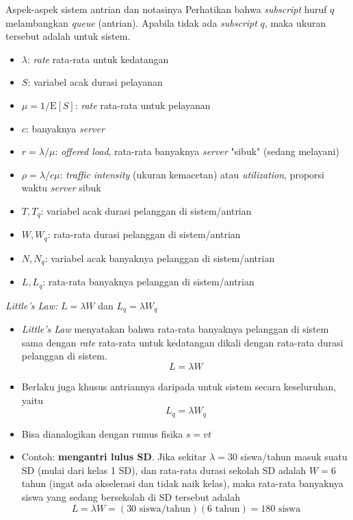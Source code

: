 \documentclass{beamer}
\newcommand{\pars}[1]{\left(#1\right)}
\newcommand{\brackets}[1]{\left[#1\right]}
\begin{document}
\begin{frame}{Aspek-aspek sistem antrian dan notasinya}
    Perhatikan bahwa \textit{subscript} huruf \(q\) melambangkan \textit{queue} (antrian). Apabila tidak ada \textit{subscript} \(q\), maka ukuran tersebut adalah untuk sistem.
    \begin{itemize}
        \item \(\lambda\): \textit{rate} rata-rata untuk kedatangan
        \item \(S\): variabel acak durasi pelayanan
        \item \(\mu = 1/\text{E}\brackets{S}\): \textit{rate} rata-rata untuk pelayanan
        \item \(c\): banyaknya \textit{server}
        \item \(r = \lambda/\mu\): \textit{offered load}, %
        rata-rata banyaknya \textit{server} "sibuk" (sedang melayani)
        \item \(\rho = \lambda/c\mu\): \textit{traffic intensity} (ukuran kemacetan) atau \textit{utilization}, proporsi waktu \textit{server} sibuk
        \item \(T, T_q\): variabel acak durasi pelanggan di sistem/antrian
        \item \(W, W_q\): rata-rata durasi pelanggan di sistem/antrian
        \item \(N, N_q\): variabel acak banyaknya pelanggan di sistem/antrian
        \item \(L, L_q\): rata-rata banyaknya pelanggan di sistem/antrian
    \end{itemize}
\end{frame}

\begin{frame}{\textit{Little's Law:} \(L = \lambda W\) dan \(L_q = \lambda W_q\)}
    \begin{itemize}
        \item \textit{Little's Law} menyatakan bahwa rata-rata banyaknya pelanggan di sistem sama dengan \textit{rate} rata-rata untuk kedatangan dikali dengan rata-rata durasi pelanggan di sistem.
        \[L = \lambda W\]
        \item Berlaku juga khusus antriannya daripada untuk sistem secara keseluruhan, yaitu
        \[L_q = \lambda W_q\]
        \item Bisa dianalogikan dengan rumus fisika \(s = vt\)
        \item Contoh: \textbf{mengantri lulus SD}. Jika sekitar \(\lambda = 30\) siswa/tahun masuk suatu SD (mulai dari kelas 1 SD), dan rata-rata durasi sekolah SD adalah \(W = 6\) tahun (ingat ada akselerasi dan tidak naik kelas), maka rata-rata banyaknya siswa yang sedang bersekolah di SD tersebut adalah
        \[L = \lambda W = \pars{30 \text{ siswa/tahun}}\pars{6 \text{ tahun}} = 180 \text{ siswa}\]
    \end{itemize}
\end{frame}
\end{document}
